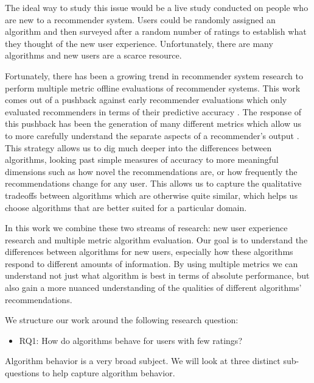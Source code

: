 \documentclass[letterpaper]{sig-alternate}
\begin{document}
  The ideal way to study this issue would be a live study conducted on people who are new to a recommender system.
  Users could be randomly assigned an algorithm and then surveyed after a random number of ratings to establish what they thought of the new user experience. 
  Unfortunately, there are many algorithms and new users are a scarce resource.
 
  Fortunately, there has been a growing trend in recommender system research to perform multiple metric offline evaluations of recommender systems.
  This work comes out of a pushback against early recommender evaluations which only evaluated recommenders in terms of their predictive accuracy \cite{accurateIsNotEnough}.
  The response of this pushback has been the generation of many different metrics which allow us to more carefully understand the separate aspects of a recommender's output \cite{LathiaTemporal, CremonesiTopN, zieglerDiversity}.
  This strategy allows us to dig much deeper into the differences between algorithms, looking past simple measures of accuracy to more meaningful dimensions such as how novel the recommendations are, or how frequently the recommendations change for any user.
  This allows us to capture the qualitative tradeoffs between algorithms which are otherwise quite similar, which helps us choose algorithms that are better suited for a particular domain.

  In this work we combine these two streams of research: new user experience research and multiple metric algorithm evaluation.
  Our goal is to understand the differences between algorithms for new users, especially how these algorithms respond to different amounts of information.
  By using multiple metrics we can understand not just what algorithm is best in terms of absolute performance, but also gain a more nuanced understanding of the qualities of different algorithms' recommendations.

  We structure our work around the following research question:
  \begin{itemize}
    \item RQ1: How do algorithms behave for users with few ratings?
  \end{itemize}
  Algorithm behavior is a very broad subject.
  We will look at three distinct sub-questions to help capture algorithm behavior.
\end{document}
